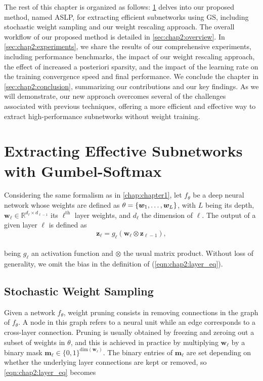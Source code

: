 The rest of this chapter is organized as follows: \cref{sec:chap2:method} delves
into our proposed method, named \acf{ASLP}, for extracting efficient subnetworks
using \acl{GS}, including stochastic weight sampling and our weight rescaling
approach. The overall workflow of our proposed method is detailed in
\cref{sec:chap2:overview}. In \cref{sec:chap2:experiments}, we share the results
of our comprehensive experiments, including performance benchmarks, the impact
of our weight rescaling approach, the effect of increased a posteriori sparsity,
and the impact of the learning rate on the training convergence speed and final
performance. We conclude the chapter in \cref{sec:chap2:conclusion}, summarizing
our contributions and our key findings. As we will demonstrate, our new approach
overcomes several of the challenges associated with previous techniques,
offering a more efficient and effective way to extract high-performance
subnetworks without weight training.


\section{Extracting Effective Subnetworks with Gumbel-Softmax}\label{sec:chap2:method}

Considering the same formalism as in \cref{chap:chapter1}, let $f_\theta$ be a
deep neural network whose weights are defined as $\theta =
  \left\{\bm{w}_1,\mathellipsis, \bm{w}_L \right\}$, with $L$ being its depth,
$\bm{w}_\ell \in \mathbb{R}^{d_{\ell} \times d_{\ell-1}}$ its $\ell^\textrm{th}$
layer weights, and $d_\ell$ the dimension of $\ell$. The output of a given layer
$\ell$ is defined as \\

\begin{equation}
  \label{eqn:chap2:layer_eq}
  \mathbf{z}_{\ell} = g_\ell(\bm{w}_\ell \otimes \mathbf{z}_{\ell-1}),
\end{equation}\\

being  $g_\ell$ an activation function and $\otimes$ the usual matrix product.
Without loss of generality, we omit the bias in the definition of
(\ref{eqn:chap2:layer_eq}).

\subsection{Stochastic Weight Sampling}
\label{sec:chap2:stochastic-sampling}
\indent Given a network $f_\theta$, weight pruning consists in removing
connections in the graph of $f_\theta$. A node in this graph refers to a neural
unit while an edge corresponds to a cross-layer connection. Pruning is usually
obtained by freezing and zeroing out  a subset of weights in $\theta$, and this
is achieved in practice by multiplying $\bm{w}_\ell$ by a binary mask
$\bm{m}_\ell \in \{ 0,1 \}^{\text{dim}(\bm{w}_\ell)}$. The binary entries of
$\bm{m}_\ell$ are set depending on whether the underlying layer connections are
kept or removed, so \cref{eqn:chap2:layer_eq} becomes\\


